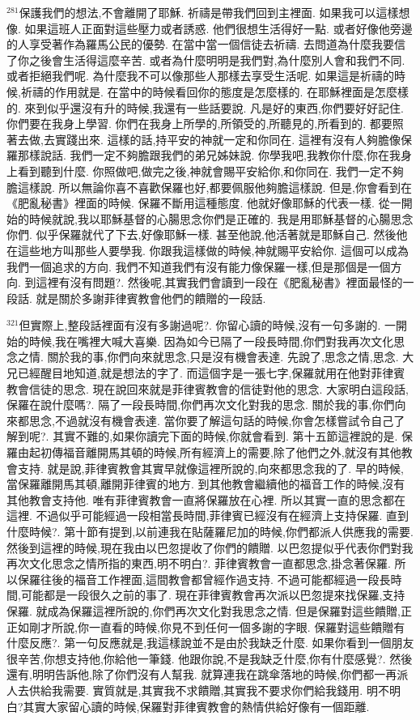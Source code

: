 \documentclass{book}
\begin{document}
$^{281}$保護我們的想法,不會離開了耶穌.
祈禱是帶我們回到主裡面.
如果我可以這樣想像.
如果這班人正面對這些壓力或者誘惑.
他們很想生活得好一點.
或者好像他旁邊的人享受著作為羅馬公民的優勢.
在當中當一個信徒去祈禱.
去問道為什麼我要信了你之後會生活得這麼辛苦.
或者為什麼明明是我們對,為什麼別人會和我們不同.
或者拒絕我們呢.
為什麼我不可以像那些人那樣去享受生活呢.
如果這是祈禱的時候,祈禱的作用就是.
在當中的時候看回你的態度是怎麼樣的.
在耶穌裡面是怎麼樣的.
來到似乎還沒有升的時候,我還有一些話要說.
凡是好的東西,你們要好好記住.
你們要在我身上學習.
你們在我身上所學的,所領受的,所聽見的,所看到的.
都要照著去做,去實踐出來.
這樣的話,持平安的神就一定和你同在.
這裡有沒有人夠膽像保羅那樣說話.
我們一定不夠膽跟我們的弟兄姊妹說.
你學我吧,我教你什麼,你在我身上看到聽到什麼.
你照做吧,做完之後,神就會賜平安給你,和你同在.
我們一定不夠膽這樣說.
所以無論你喜不喜歡保羅也好,都要佩服他夠膽這樣說.
但是,你會看到在《肥亂秘書》裡面的時候.
保羅不斷用這種態度.
他就好像耶穌的代表一樣.
從一開始的時候就說,我以耶穌基督的心腸思念你們是正確的.
我是用耶穌基督的心腸思念你們.
似乎保羅就代了下去,好像耶穌一樣.
甚至他說,他活著就是耶穌自己.
然後他在這些地方叫那些人要學我.
你跟我這樣做的時候,神就賜平安給你.
這個可以成為我們一個追求的方向.
我們不知道我們有沒有能力像保羅一樣,但是那個是一個方向.
到這裡有沒有問題?.
然後呢,其實我們會讀到一段在《肥亂秘書》裡面最怪的一段話.
就是關於多謝菲律賓教會他們的饋贈的一段話.

$^{321}$但實際上,整段話裡面有沒有多謝過呢?.
你留心讀的時候,沒有一句多謝的.
一開始的時候,我在嘴裡大喊大喜樂.
因為如今已隔了一段長時間,你們對我再次文化思念之情.
關於我的事,你們向來就思念,只是沒有機會表達.
先說了,思念之情,思念.
大兄已經醒目地知道,就是想法的字了.
而這個字是一張七字,保羅就用在他對菲律賓教會信徒的思念.
現在說回來就是菲律賓教會的信徒對他的思念.
大家明白這段話,保羅在說什麼嗎?.
隔了一段長時間,你們再次文化對我的思念.
關於我的事,你們向來都思念,不過就沒有機會表達.
當你要了解這句話的時候,你會怎樣嘗試令自己了解到呢?.
其實不難的,如果你讀完下面的時候,你就會看到.
第十五節這裡說的是.
保羅由起初傳福音離開馬其頓的時候,所有經濟上的需要,除了他們之外,就沒有其他教會支持.
就是說,菲律賓教會其實早就像這裡所說的,向來都思念我的了.
早的時候,當保羅離開馬其頓,離開菲律賓的地方.
到其他教會繼續他的福音工作的時候,沒有其他教會支持他.
唯有菲律賓教會一直將保羅放在心裡.
所以其實一直的思念都在這裡.
不過似乎可能經過一段相當長時間,菲律賓已經沒有在經濟上支持保羅.
直到什麼時候?.
第十節有提到,以前連我在貼薩羅尼加的時候,你們都派人供應我的需要.
然後到這裡的時候,現在我由以巴忽提收了你們的饋贈.
以巴忽提似乎代表你們對我再次文化思念之情所指的東西,明不明白?.
菲律賓教會一直都思念,掛念著保羅.
所以保羅往後的福音工作裡面,這間教會都曾經作過支持.
不過可能都經過一段長時間,可能都是一段很久之前的事了.
現在菲律賓教會再次派以巴忽提來找保羅,支持保羅.
就成為保羅這裡所說的,你們再次文化對我思念之情.
但是保羅對這些饋贈,正正如剛才所說,你一直看的時候,你見不到任何一個多謝的字眼.
保羅對這些饋贈有什麼反應?.
第一句反應就是,我這樣說並不是由於我缺乏什麼.
如果你看到一個朋友很辛苦,你想支持他,你給他一筆錢.
他跟你說,不是我缺乏什麼,你有什麼感覺?.
然後還有,明明告訴他,除了你們沒有人幫我.
就算連我在跳傘落地的時候,你們都一再派人去供給我需要.
實質就是,其實我不求饋贈,其實我不要求你們給我錢用.
明不明白?其實大家留心讀的時候,保羅對菲律賓教會的熱情供給好像有一個距離.
\end{document}
